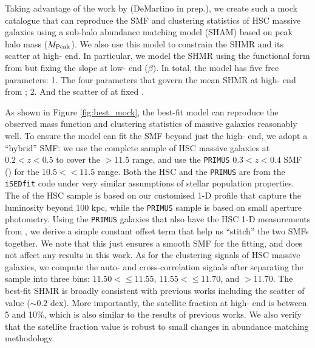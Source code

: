 \documentclass[fleqn,usenatbib,useAMS]{mnras}
\begin{document}
\begin{CJK*}{UTF8}{gbsn}
    Taking advantage of the work by (DeMartino \etal{} in prep.), we create such a mock catalogue 
    that can reproduce the SMF and clustering statistics of HSC massive galaxies using a sub-halo 
    abundance matching model (SHAM) based on peak halo mass ($M_{\rm Peak}$).
    We also use this model to constrain the SHMR and its scatter at high-\mhalo{} end.
    In particular, we model the SHMR using the functional form from \citet{Behroozi2013} but
    fixing the slope at low-\mhalo{} end ($\beta$).
    In total, the model has five free parameters:
    1. The four parameters that govern the mean SHMR at high-\mhalo{} end from 
    \citet{Behroozi2013};
    2. And the scatter of \mstar{} at fixed \mhalo{}.

    As shown in Figure \ref{fig:best_mock}, the best-fit model can reproduce the observed
    mass function and clustering statistics of massive galaxies reasonably well.
    To ensure the model can fit the SMF beyond just the high-\mstar{} end, we adopt a ``hybrid''
    SMF: we use the complete sample of HSC massive galaxies at $0.2 < z < 0.5$ to cover the
    \logms{}$>11.5$ range, and use the \texttt{PRIMUS} $0.3 < z < 0.4$ SMF
    (\citealt{Moustakas2013}) for the $10.5 <$\logms{}$<11.5$ range.
    Both the HSC and the \texttt{PRIMUS} \mstar{} are from the \texttt{iSEDfit} code under very
    similar assumptions of stellar population properties.
    The \mstar{} of the HSC sample is based on our customised 1-D profile that capture the
    luminosity beyond 100 kpc, while the \texttt{PRIMUS} sample is based on small aperture
    photometry.
    Using the \texttt{PRIMUS} galaxies that also have the HSC 1-D \mstar{} measurements from
    \citet{Huang2018b}, we derive a simple constant offset term that help us ``stitch'' the two
    SMFs together.
    We note that this just ensures a smooth SMF for the fitting, and does not affect any results
    in this work.
    As for the clustering signals of HSC massive galaxies, we compute the auto- and
    cross-correlation signals after separating the sample into three \mstar{} bins: $11.50
    <$\logms{}$\leq 11.55$, $11.55 <$\logms{}$\leq 11.70$, and \logms{}$> 11.70$.
    The best-fit SHMR is broadly consistent with previous works including the scatter of
    \mstar{} value ($\sim 0.2$ dex).
    More importantly, the satellite fraction at high-\mstar{} end is between 5 and 10\%, which is also
    similar to the results of previous works.
    We also verify that the satellite fraction value is robust to small changes in abundance
    matching methodology.


\end{CJK*}
\end{document}
